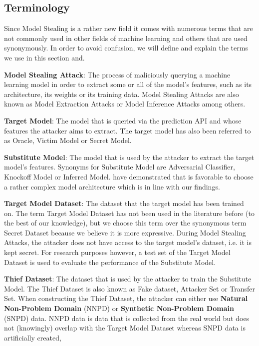 \subsection{Terminology}
\label{sec:ModelStealing:Terminology}
Since Model Stealing is a rather new field it comes with numerous terms that are not commonly used in other fields of machine learning and others that are used 
synonymously. In order to avoid confusion, we will define and explain the terms we use in this section and. \par
\textbf{Model Stealing Attack}: The process of maliciously querying a machine learning model in order to extract some or all of the model's features, such as its
architecture, its weights or its training data. Model Stealing Attacks are also known as Model Extraction Attacks or Model Inference Attacks among others. \par
\textbf{Target Model}: The model that is queried via the prediction API and whose features the attacker aims to extract. The target model has also been referred to 
as Oracle, Victim Model or Secret Model. \par
\textbf{Substitute Model}: The model that is used by the attacker to extract the target model's features. Synonyms for Substitute Model are Adversarial Classifier,
Knockoff Model or Inferred Model. \cite{orekondy2019knockoff} have demonstrated that is favorable to choose a rather complex model architecture which is in line with 
our findings.\par
\textbf{Target Model Dataset}: The dataset that the target model has been trained on. The term Target Model Dataset has not been used in the literature before (to 
the best of our knowledge), but we choose this term over the synonymous term Secret Dataset because we believe it is more expressive. During Model Stealing Attacks,
the attacker does not have access to the target model's dataset, i.e. it is kept secret. For research purposes however, a test set of the Target Model Dataset is
used to evaluate the performance of the Substitute Model. \par
\textbf{Thief Dataset}: The dataset that is used by the attacker to train the Substitute Model. The Thief Dataset is also known as Fake dataset, Attacker Set or 
Transfer Set. When constructing the Thief Dataset, the attacker can either use \textbf{Natural Non-Problem Domain} (NNPD) or \textbf{Synthetic Non-Problem Domain} (SNPD)
data. NNPD data is data that is collected from the real world but does not (knowingly) overlap with the Target Model Dataset whereas SNPD data is artificially created,
